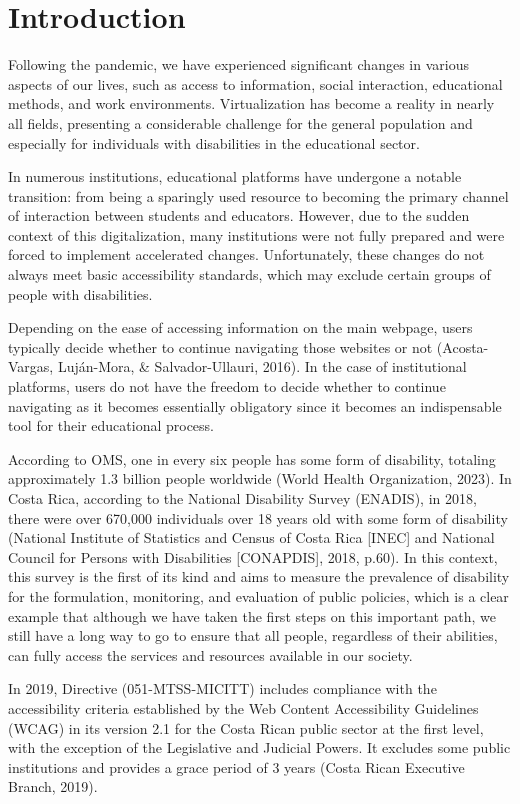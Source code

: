 \documentclass{IEEEtran}
\begin{document}
\section{Introduction}
Following the pandemic, we have experienced significant changes in various aspects of our lives, such as access to information, social interaction, educational methods, and work environments. Virtualization has become a reality in nearly all fields, presenting a considerable challenge for the general population and especially for individuals with disabilities in the educational sector.

In numerous institutions, educational platforms have undergone a notable transition: from being a sparingly used resource to becoming the primary channel of interaction between students and educators. However, due to the sudden context of this digitalization, many institutions were not fully prepared and were forced to implement accelerated changes. Unfortunately, these changes do not always meet basic accessibility standards, which may exclude certain groups of people with disabilities.

Depending on the ease of accessing information on the main webpage, users typically decide whether to continue navigating those websites or not \cite{AcostaVargas2016}(Acosta-Vargas, Luján-Mora, \& Salvador-Ullauri, 2016). In the case of institutional platforms, users do not have the freedom to decide whether to continue navigating as it becomes essentially obligatory since it becomes an indispensable tool for their educational process.

According to OMS, one in every six people has some form of disability, totaling approximately 1.3 billion people worldwide \cite{Organizacion2023}(World Health Organization, 2023). In Costa Rica, according to the National Disability Survey (ENADIS), in 2018, there were over 670,000 individuals over 18 years old with some form of disability \cite{Instituto2018}(National Institute of Statistics and Census of Costa Rica [INEC] and National Council for Persons with Disabilities [CONAPDIS], 2018, p.60). In this context, this survey is the first of its kind and aims to measure the prevalence of disability for the formulation, monitoring, and evaluation of public policies, which is a clear example that although we have taken the first steps on this important path, we still have a long way to go to ensure that all people, regardless of their abilities, can fully access the services and resources available in our society.

In 2019, Directive (051-MTSS-MICITT) includes compliance with the accessibility criteria established by the Web Content Accessibility Guidelines (WCAG) in its version 2.1 for the Costa Rican public sector at the first level, with the exception of the Legislative and Judicial Powers. It excludes some public institutions and provides a grace period of 3 years \cite{SCOM}(Costa Rican Executive Branch, 2019).
\end{document}
